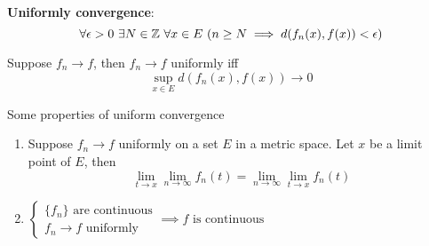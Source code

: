     \begin{defi}
        \textbf{Uniformly convergence}:
        \begin{equation}
            \forall \epsilon > 0 \ \exists N \in \Z \ \forall x \in E \ ( n \geq N \implies  d(f_n(x), f(x)) < \epsilon)
        \end{equation}
    \end{defi}

    \begin{defi}
        Suppose $f_n \to f$, then $f_n \to f$ uniformly iff
        \begin{equation}
            \sup_{x \in E} d(f_n(x), f(x)) \to 0
        \end{equation}
    \end{defi}

    \begin{theo}
        Some properties of uniform convergence
        \begin{enumerate}
            \item Suppose $f_n \to f$ uniformly on a set $E$ in a metric space. Let $x$ be a limit point of $E$, then
            \begin{equation}
                \lim_{t \to x}\lim_{n \to \infty} f_n(t) = \lim_{n \to \infty}\lim_{t \to x} f_n(t)
            \end{equation}

            \item $
            \begin{cases}
                \{f_n\} \text{ are continuous} \\
                f_n \to f \text{ uniformly}
            \end{cases}
            \implies f \text{ is continuous}
            $
        \end{enumerate}
        
    \end{theo}

